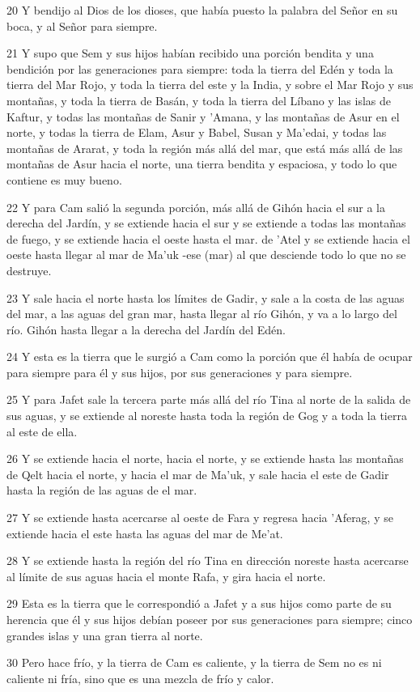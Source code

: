 \par 20 Y bendijo al Dios de los dioses, que había puesto la palabra del Señor en su boca, y al Señor para siempre.
\par 21 Y supo que Sem y sus hijos habían recibido una porción bendita y una bendición por las generaciones para siempre: toda la tierra del Edén y toda la tierra del Mar Rojo, y toda la tierra del este y la India, y sobre el Mar Rojo y sus montañas, y toda la tierra de Basán, y toda la tierra del Líbano y las islas de Kaftur, y todas las montañas de Sanir y 'Amana, y las montañas de Asur en el norte, y todas la tierra de Elam, Asur y Babel, Susan y Ma'edai, y todas las montañas de Ararat, y toda la región más allá del mar, que está más allá de las montañas de Asur hacia el norte, una tierra bendita y espaciosa, y todo lo que contiene es muy bueno.
\par 22 Y para Cam salió la segunda porción, más allá de Gihón hacia el sur a la derecha del Jardín, y se extiende hacia el sur y se extiende a todas las montañas de fuego, y se extiende hacia el oeste hasta el mar. de 'Atel y se extiende hacia el oeste hasta llegar al mar de Ma'uk -ese (mar) al que desciende todo lo que no se destruye.
\par 23 Y sale hacia el norte hasta los límites de Gadir, y sale a la costa de las aguas del mar, a las aguas del gran mar, hasta llegar al río Gihón, y va a lo largo del río. Gihón hasta llegar a la derecha del Jardín del Edén.
\par 24 Y esta es la tierra que le surgió a Cam como la porción que él había de ocupar para siempre para él y sus hijos, por sus generaciones y para siempre.
\par 25 Y para Jafet sale la tercera parte más allá del río Tina al norte de la salida de sus aguas, y se extiende al noreste hasta toda la región de Gog y a toda la tierra al este de ella.
\par 26 Y se extiende hacia el norte, hacia el norte, y se extiende hasta las montañas de Qelt hacia el norte, y hacia el mar de Ma'uk, y sale hacia el este de Gadir hasta la región de las aguas de el mar.
\par 27 Y se extiende hasta acercarse al oeste de Fara y regresa hacia 'Aferag, y se extiende hacia el este hasta las aguas del mar de Me'at.
\par 28 Y se extiende hasta la región del río Tina en dirección noreste hasta acercarse al límite de sus aguas hacia el monte Rafa, y gira hacia el norte.
\par 29 Esta es la tierra que le correspondió a Jafet y a sus hijos como parte de su herencia que él y sus hijos debían poseer por sus generaciones para siempre; cinco grandes islas y una gran tierra al norte.
\par 30 Pero hace frío, y la tierra de Cam es caliente, y la tierra de Sem no es ni caliente ni fría, sino que es una mezcla de frío y calor.

